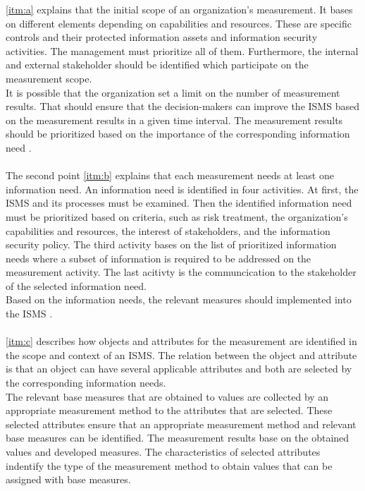 \ref{itm:a} explains that the initial scope of an organization's measurement. It bases on different elements depending on capabilities and resources. These are specific controls and their protected information assets and information security activities. The management must prioritize all of them. Furthermore, the internal and external stakeholder should be identified which participate on the measurement scope. \\
It is possible that the organization set a limit on the number of measurement results. That should ensure that the decision-makers can improve the ISMS based on the measurement results in a given time interval. The measurement results should be prioritized based on the importance of the corresponding information need \cite{ISO_27004_2009}. \\ \\
The second point \ref{itm:b} explains that each measurement needs at least one information need. An information need is identified in four activities. At first, the ISMS and its processes must be examined. Then the identified information need must be prioritized based on criteria, such as risk treatment, the organization's capabilities and resources, the interest of stakeholders, and the information security policy. The third activity bases on the list of prioritized information needs where a subset of information is required to be addressed on the measurement activity. The last acitivty is the communcication to the stakeholder of the selected information need. \\
Based on the information needs, the relevant measures should implemented into the ISMS \cite{ISO_27004_2009}. \\ \\
\ref{itm:c} describes how objects and attributes for the measurement are identified in the scope and context of an ISMS. The relation between the object and attribute is that an object can have several applicable attributes and both are selected by the corresponding information needs. \\
The relevant base measures that are obtained to values are collected by an appropriate measurement method to the attributes that are selected. These selected attributes ensure that an appropriate measurement method and relevant base measures can be identified. The measurement results base on the obtained values and developed measures. The characteristics of selected attributes indentify the type of the measurement method to obtain values that can be assigned with base measures. \\

